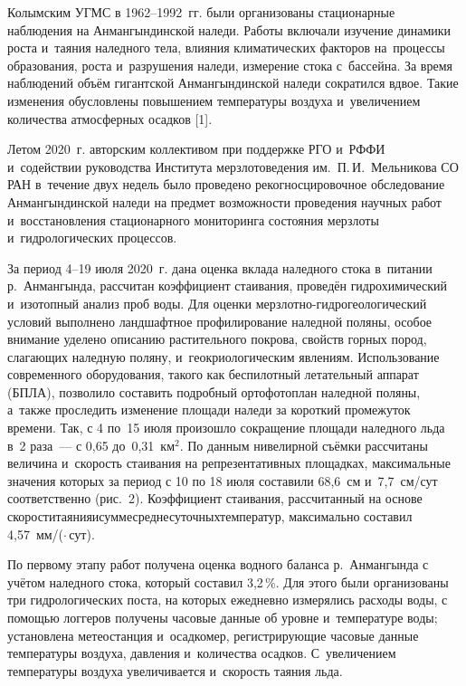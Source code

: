 Колымским УГМС в 1962--1992~гг. были организованы стационарные наблюдения на Анмангындинской наледи. Работы включали изучение динамики роста и~таяния наледного тела, влияния климатических факторов на~процессы образования, роста и~разрушения наледи, измерение стока с~бассейна. За время наблюдений объём гигантской Анмангындинской наледи сократился вдвое. Такие изменения обусловлены повышением температуры воздуха и~увеличением количества атмосферных осадков [1].

Летом 2020~г. авторским коллективом при поддержке РГО и~РФФИ и~содействии руководства Института мерзлотоведения им.~П.\,И.~Мельникова СО РАН в~течение двух недель было проведено рекогносцировочное обследование Анмангындинской наледи на предмет возможности проведения научных работ и~восстановления стационарного мониторинга состояния мерзлоты и~гидрологических процессов.

За период 4--19 июля 2020~г. дана оценка вклада наледного стока в~питании р.~Анмангында, рассчитан коэффициент стаивания, проведён гидрохимический и~изотопный анализ проб воды. Для оценки мерзлотно-гидрогеологический условий выполнено ландшафтное профилирование наледной поляны, особое внимание уделено описанию растительного покрова, свойств горных пород, слагающих наледную поляну, и~геокриологическим явлениям. Использование современного оборудования, такого как беспилотный летательный аппарат (БПЛА), позволило составить подробный ортофотоплан наледной поляны, а~также проследить изменение площади наледи за короткий промежуток времени. Так, с 4 по~15 июля произошло сокращение площади наледного льда в~2 раза~--- с 0,65 до~0,31~км$^2$. По данным нивелирной съёмки рассчитаны величина и~скорость стаивания на репрезентативных площадках, максимальные значения которых за период с 10 по 18 июля составили 68,6~см и~7,7~см/сут соответственно (рис.~2). Коэффициент стаивания, рассчитанный на основе скорости\;\;таяния\;\;и\;\;сумме\;\;среднесуточных\;\;температур, максимально составил 4,57~мм/(\dgc$\cdot$\,сут).



По первому этапу работ получена оценка водного баланса р.~Анмангында с учётом наледного стока, который составил 3,2\,\%. Для этого были организованы три гидрологических поста, на которых ежедневно измерялись расходы воды, с помощью логгеров получены часовые данные об уровне и~температуре воды; установлена метеостанция и~осадкомер, регистрирующие часовые данные температуры воздуха, давления и~количества осадков. С~увеличением температуры воздуха увеличивается и~скорость таяния льда.


